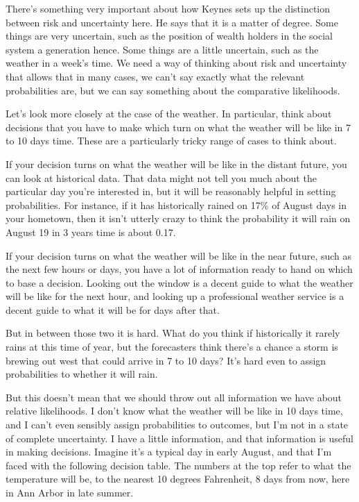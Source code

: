 \noindent There's something very important about how Keynes sets up the distinction between risk and uncertainty here. He says that it is a matter of degree. Some things are very uncertain, such as the position of wealth holders in the social system a generation hence. Some things are a little uncertain, such as the weather in a week's time. We need a way of thinking about risk and uncertainty that allows that in many cases, we can't say exactly what the relevant probabilities are, but we can say something about the comparative likelihoods.

Let's look more closely at the case of the weather. In particular, think about decisions that you have to make which turn on what the weather will be like in 7 to 10 days time. These are a particularly tricky range of cases to think about. 

If your decision turns on what the weather will be like in the distant future, you can look at historical data. That data might not tell you much about the particular day you're interested in, but it will be reasonably helpful in setting probabilities. For instance, if it has historically rained on 17\% of August days in your hometown, then it isn't utterly crazy to think the probability it will rain on August 19 in 3 years time is about 0.17.

If your decision turns on what the weather will be like in the near future, such as the next few hours or days, you have a lot of information ready to hand on which to base a decision. Looking out the window is a decent guide to what the weather will be like for the next hour, and looking up a professional weather service is a decent guide to what it will be for days after that. 

But in between those two it is hard. What do you think if historically it rarely rains at this time of year, but the forecasters think there's a chance a storm is brewing out west that could arrive in 7 to 10 days? It's hard even to assign probabilities to whether it will rain.

But this doesn't mean that we should throw out all information we have about relative likelihoods. I don't know what the weather will be like in 10 days time, and I can't even sensibly assign probabilities to outcomes, but I'm not in a state of complete uncertainty. I have a little information, and that information is useful in making decisions. Imagine it's a typical day in early August, and that I'm faced with the following decision table. The numbers at the top refer to what the temperature will be, to the nearest 10 degrees Fahrenheit, 8 days from now, here in Ann Arbor in late summer.

